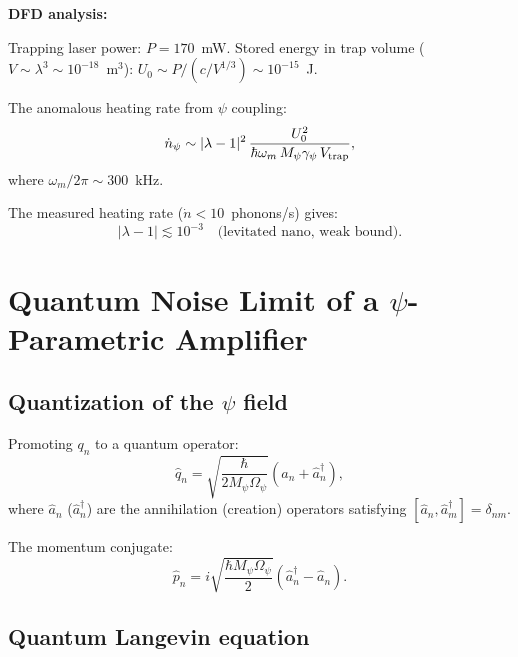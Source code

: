 \documentclass[12pt,aps,prd,twocolumn,superscriptaddress,nofootinbib]{revtex4-2}
\newcommand{\Opsi}{\Omega_\psi}
\newcommand{\gpsi}{\gamma_\psi}
\newcommand{\Mpsi}{M_\psi}
\begin{document}
\textbf{DFD analysis:}

Trapping laser power: $P = 170$~mW.  Stored energy in trap volume
($V \sim \lambda^3 \sim 10^{-18}$~m$^3$):
$U_0 \sim P/(c/V^{1/3}) \sim 10^{-15}$~J.

The anomalous heating rate from $\psi$ coupling:
\begin{equation}
\dot{n}_\psi \sim |\lambda-1|^2\,\frac{U_0^2}
{\hbar\omega_m\,\Mpsi\gpsi\,V_{\rm trap}},
\label{eq:nano_heating}
\end{equation}
where $\omega_m/2\pi \sim 300$~kHz.

The measured heating rate ($\dot{n} < 10$~phonons/s) gives:
\begin{equation}
|\lambda-1| \lesssim 10^{-3}
\quad\text{(levitated nano, weak bound)}.
\label{eq:nano_bound}
\end{equation}



\section{Quantum Noise Limit of a $\psi$-Parametric Amplifier}
\label{sec:quantum}

\subsection{Quantization of the $\psi$ field}

Promoting $q_n$ to a quantum operator:
\begin{equation}
\hat{q}_n = \sqrt{\frac{\hbar}{2\Mpsi\Opsi}}
(\hat{a}_n + \hat{a}_n^\dagger),
\label{eq:q_quantized}
\end{equation}
where $\hat{a}_n$ ($\hat{a}_n^\dagger$) are the annihilation
(creation) operators satisfying
$[\hat{a}_n, \hat{a}_m^\dagger] = \delta_{nm}$.

The momentum conjugate:
\begin{equation}
\hat{p}_n = i\sqrt{\frac{\hbar\Mpsi\Opsi}{2}}
(\hat{a}_n^\dagger - \hat{a}_n).
\label{eq:p_quantized}
\end{equation}

\subsection{Quantum Langevin equation}
\end{document}
